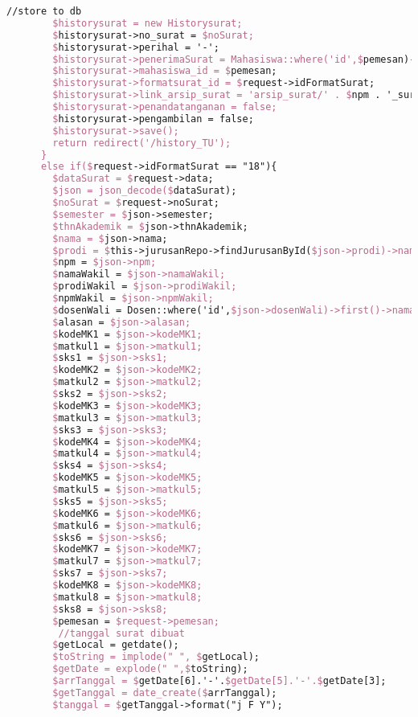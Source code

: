 \begin{lstlisting}[language=tex,basicstyle=\tiny,caption=HistorysuratController.php]
        //store to db
        $historysurat = new Historysurat;
        $historysurat->no_surat = $noSurat;
        $historysurat->perihal = '-';
        $historysurat->penerimaSurat = Mahasiswa::where('id',$pemesan)->first()->dosen->nama_dosen;
        $historysurat->mahasiswa_id = $pemesan;
        $historysurat->formatsurat_id = $request->idFormatSurat;
        $historysurat->link_arsip_surat = 'arsip_surat/' . $npm . '_surat_perwakilan_perwalian_7mk.pdf';
        $historysurat->penandatanganan = false;
        $historysurat->pengambilan = false;
        $historysurat->save();
        return redirect('/history_TU');
      }
      else if($request->idFormatSurat == "18"){
        $dataSurat = $request->data;
        $json = json_decode($dataSurat);
        $noSurat = $request->noSurat;
        $semester = $json->semester;
        $thnAkademik = $json->thnAkademik;
        $nama = $json->nama;
        $prodi = $this->jurusanRepo->findJurusanById($json->prodi)->nama_jurusan;
        $npm = $json->npm;
        $namaWakil = $json->namaWakil;
        $prodiWakil = $json->prodiWakil;
        $npmWakil = $json->npmWakil;
        $dosenWali = Dosen::where('id',$json->dosenWali)->first()->nama_dosen;
        $alasan = $json->alasan;
        $kodeMK1 = $json->kodeMK1;
        $matkul1 = $json->matkul1;
        $sks1 = $json->sks1;
        $kodeMK2 = $json->kodeMK2;
        $matkul2 = $json->matkul2;
        $sks2 = $json->sks2;
        $kodeMK3 = $json->kodeMK3;
        $matkul3 = $json->matkul3;
        $sks3 = $json->sks3;
        $kodeMK4 = $json->kodeMK4;
        $matkul4 = $json->matkul4;
        $sks4 = $json->sks4;
        $kodeMK5 = $json->kodeMK5;
        $matkul5 = $json->matkul5;
        $sks5 = $json->sks5;
        $kodeMK6 = $json->kodeMK6;
        $matkul6 = $json->matkul6;
        $sks6 = $json->sks6;
        $kodeMK7 = $json->kodeMK7;
        $matkul7 = $json->matkul7;
        $sks7 = $json->sks7;
        $kodeMK8 = $json->kodeMK8;
        $matkul8 = $json->matkul8;
        $sks8 = $json->sks8;
        $pemesan = $request->pemesan;
         //tanggal surat dibuat
        $getLocal = getdate();
        $toString = implode(" ", $getLocal);
        $getDate = explode(" ",$toString);
        $arrTanggal = $getDate[6].'-'.$getDate[5].'-'.$getDate[3];
        $getTanggal = date_create($arrTanggal);
        $tanggal = $getTanggal->format("j F Y");


\end{lstlisting}
